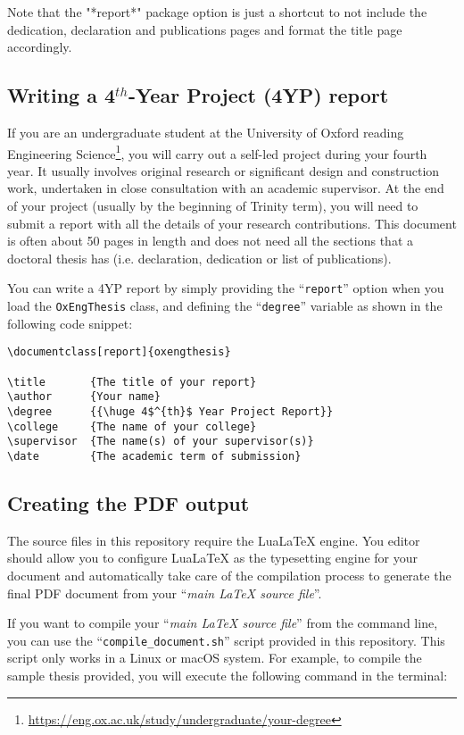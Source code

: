 Note that the "*report*" package option is just a shortcut to not include the dedication, declaration and publications pages and format the title page accordingly.


\subsection{Writing a 4$^{th}$-Year Project (4YP) report}


If you are an undergraduate student at the University of Oxford reading Engineering Science\footnote{\url{https://eng.ox.ac.uk/study/undergraduate/your-degree}}, you will carry out a self-led project during your fourth year. It usually involves original research or significant design and construction work, undertaken in close consultation with an academic supervisor. At the end of your project (usually by the beginning of Trinity term), you will need to submit a report with all the details of your research contributions. This document is often about 50 pages in length and does not need all the sections that a doctoral thesis has (i.e. declaration, dedication or list of publications). 

You can write a 4YP report by simply providing the ``\verb|report|'' option when you load the \verb|OxEngThesis| class, and defining the ``\verb|degree|'' variable as shown in  the following code snippet:


\begin{lstlisting}[style=custom-latex]
\documentclass[report]{oxengthesis}

\title       {The title of your report}
\author      {Your name}
\degree      {{\huge 4$^{th}$ Year Project Report}}
\college     {The name of your college}
\supervisor  {The name(s) of your supervisor(s)}
\date        {The academic term of submission}
\end{lstlisting}


\subsection{Creating the PDF output}


The source files in this repository require the LuaLaTeX engine. You editor should allow you to configure LuaLaTeX as the typesetting engine for your document and automatically take care of the compilation process to generate the final PDF document from your ``\textit{main LaTeX source file}''.

If you want to compile your ``\textit{main LaTeX source file}'' from the command line, you can use the ``\verb|compile_document.sh|'' script provided in this repository. This script only works in a Linux or macOS system. For example, to compile the sample thesis provided, you will execute the following command in the terminal:



